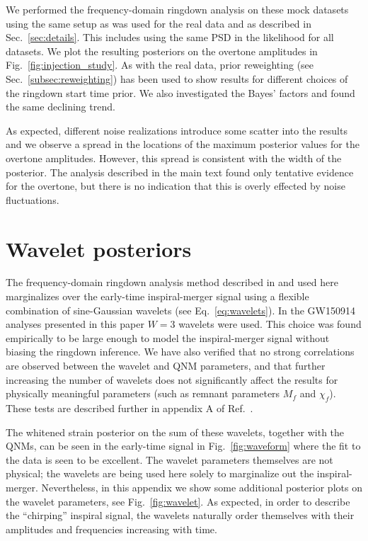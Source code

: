 We performed the frequency-domain ringdown analysis on these mock datasets using the same setup as was used for the real data and as described in Sec.~\ref{sec:details}.
This includes using the same PSD in the likelihood for all datasets.
We plot the resulting posteriors on the overtone amplitudes in Fig.~\ref{fig:injection_study}.
As with the real data, prior reweighting (see Sec.~\ref{subsec:reweighting}) has been used to show results for different choices of the ringdown start time prior.
We also investigated the Bayes' factors and found the same declining trend.

As expected, different noise realizations introduce some scatter into the results and we observe a spread in the locations of the maximum posterior values for the overtone amplitudes. 
However, this spread is consistent with the width of the posterior. 
The analysis described in the main text found only tentative evidence for the overtone, but there is no indication that this is overly effected by noise fluctuations.


\section{Wavelet posteriors}\label{app:W3}

The frequency-domain ringdown analysis method described in \cite{Finch:2021qph} and used here marginalizes over the early-time inspiral-merger signal using a flexible combination of sine-Gaussian wavelets (see Eq.~\ref{eq:wavelets}).
In the GW150914 analyses presented in this paper $W=3$ wavelets were used.
This choice was found empirically to be large enough to model the inspiral-merger signal without biasing the ringdown inference.
We have also verified that no strong correlations are observed between the wavelet and QNM parameters, and that further increasing the number of wavelets does not significantly affect the results for physically meaningful parameters (such as remnant parameters $M_f$ and $\chi_f$). 
These tests are described further in appendix A of Ref.~\cite{Finch:2021qph}.

The whitened strain posterior on the sum of these wavelets, together with the QNMs, can be seen in the early-time signal in Fig.~\ref{fig:waveform} where the fit to the data is seen to be excellent.
The wavelet parameters themselves are not physical; the wavelets are being used here solely to marginalize out the inspiral-merger. 
Nevertheless, in this appendix we show some additional posterior plots on the wavelet parameters, see Fig.~\ref{fig:wavelet}.
As expected, in order to describe the ``chirping'' inspiral signal, the wavelets naturally order themselves with their amplitudes and frequencies increasing with time. 

